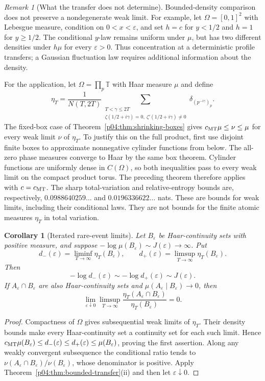 \documentclass[11pt,letterpaper]{article}
\newtheorem{corollary}[theorem]{Corollary}
\theoremstyle{definition}
\theoremstyle{remark}
\newtheorem{remark}[theorem]{Remark}
\newcommand{\1}{\mathbf 1}
\begin{document}
\begin{remark}[What the transfer does not determine]
Bounded-density comparison does not preserve a nondegenerate weak
limit.  For example, let $\Omega=[0,1]^2$ with Lebesgue measure,
condition on $0<x<\varepsilon$, and set $h=c$ for $y<1/2$ and
$h=1$ for $y\ge1/2$.  The conditional $y$-law remains uniform
under $\mu$, but has two different densities under $h\mu$ for
every $\varepsilon>0$.  Thus concentration at a deterministic
profile transfers; a Gaussian fluctuation law requires additional
information about the density.
\end{remark}

For the application, let $\Omega=\prod_p\mathbb T$ with Haar
measure $\mu$ and define
\[
 \eta_T=\frac1{N(T,2T)}
 \sum_{\substack{T<\gamma\le2T\\
 \zeta(1/2+i\gamma)=0,\ \zeta'(1/2+i\gamma)\ne0}}
 \delta_{(p^{-i\gamma})_p}.
\]
The fixed-box case of Theorem~\ref{p04:thm:shrinking-boxes} gives
$c_{\rm MT}\mu\le\nu\le\mu$ for every weak limit $\nu$ of
$\eta_T$. To justify this on the full product, first use disjoint
finite boxes to approximate nonnegative cylinder functions from below.
The all-zero phase measures converge to Haar by the same box theorem.
Cylinder functions are uniformly dense in $C(\Omega)$, so both
inequalities pass to every weak limit on the compact product torus.  The preceding theorem therefore applies with
$c=c_{\rm MT}$.  The sharp total-variation and relative-entropy
bounds are, respectively, $0.0988640259\ldots$ and
$0.0196336622\ldots$ nats.  These are bounds for weak limits,
including their conditional laws.  They are not bounds for the
finite atomic measures $\eta_T$ in total variation.

\begin{corollary}[Iterated rare-event limits]
\label{p04:cor:iterated-rare-transfer}
Let $B_\varepsilon$ be Haar-continuity sets with positive measure,
and suppose
$-\log\mu(B_\varepsilon)\sim J(\varepsilon)\to\infty$.
Put
\[
 d_-(\varepsilon)=\liminf_{T\to\infty}\eta_T(B_\varepsilon),
 \qquad
 d_+(\varepsilon)=\limsup_{T\to\infty}\eta_T(B_\varepsilon).
\]
Then
\[
 -\log d_-(\varepsilon)
 \sim-\log d_+(\varepsilon)\sim J(\varepsilon).
\]
If $A_\varepsilon\cap B_\varepsilon$ are also Haar-continuity
sets and $\mu(A_\varepsilon\mid B_\varepsilon)\to0$, then
\[
 \lim_{\varepsilon\downarrow0}\limsup_{T\to\infty}
 \frac{\eta_T(A_\varepsilon\cap B_\varepsilon)}
      {\eta_T(B_\varepsilon)}=0.
\]
\end{corollary}
\begin{proof}
Compactness of $\Omega$ gives subsequential weak limits of
$\eta_T$.  Their density bounds make every Haar-continuity set
a continuity set for each such limit.  Hence
$c_{\rm MT}\mu(B_\varepsilon)\le d_-(\varepsilon)
\le d_+(\varepsilon)\le\mu(B_\varepsilon)$, proving the first
assertion.  Along any weakly convergent subsequence the conditional
ratio tends to $\nu(A_\varepsilon\cap B_\varepsilon)/
\nu(B_\varepsilon)$, whose denominator is positive.  Apply
Theorem~\ref{p04:thm:bounded-transfer}(ii) and then let
$\varepsilon\downarrow0$.
\end{proof}
\end{document}
